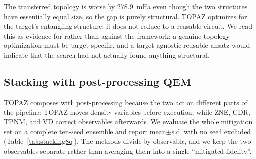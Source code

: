 \documentclass[twocolumn,aps,prl,superscriptaddress,showkeys]{revtex4-2}
\theoremstyle{plain}
\theoremstyle{definition}
\begin{document}
\begin{table}[htbp]
\centering
\caption{Cross-Hamiltonian transfer of an optimized topology, 8-qubit TFIM at $J=h=1$ (FCI $E_0=-9.837951$~Ha). The transferred and fresh structures are of essentially equal size, so the gap is structural rather than a gate-count effect.}
\label{tab:ham-transfer}
\end{table}

The transferred topology is worse by $278.9$~mHa even though the two structures have essentially equal size, so the gap is purely structural. TOPAZ optimizes for the target's entangling structure; it does not reduce to a reusable circuit. We read this as evidence for rather than against the framework: a genuine topology optimization must be target-specific, and a target-agnostic reusable ansatz would indicate that the search had not actually found anything structural.

\subsection{Stacking with post-processing QEM}
\label{sec:stack}

TOPAZ composes with post-processing because the two act on different parts of the pipeline: TOPAZ moves density variables before execution, while ZNE, CDR, TPNM, and VD correct observables afterwards. We evaluate the whole mitigation set on a complete ten-seed ensemble and report mean$\pm$s.d. with no seed excluded (Table~\ref{tab:stacking8q}). The methods divide by observable, and we keep the two observables separate rather than averaging them into a single ``mitigated fidelity''.
\end{document}
